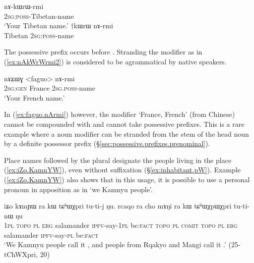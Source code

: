 \begin{exe}
 	\ex  \label{ex:nAkWrWrmi}
		\gll nɤ-kɯrɯ-rmi   \\
		\textsc{2sg}:\textsc{poss}-Tibetan-name \\
		\glt `Your Tibetan name.' 
		\ex  \label{ex:nAkWrWrmi2}
		\gll $\dagger$kɯrɯ nɤ-rmi   \\
		Tibetan \textsc{2sg}:\textsc{poss}-name \\		
\end{exe}

The possessive prefix occurs before . Stranding the modifier as in (\ref{ex:nAkWrWrmi2}) is considered to be agrammatical by native speakers.
 
\begin{exe}
	\ex  \label{ex:faguo.nArmi}
	\gll nɤʑɯɣ <faguo> nɤ-rmi   \\
	\textsc{2sg}:\textsc{gen} France \textsc{2sg}.\textsc{poss}-name \\
	\glt `Your French name.' 
\end{exe}
 
 
In (\ref{ex:faguo.nArmi}) however, the modifier  `France, French' (from Chinese) cannot be compounded with   and cannot take possessive prefixes. This is a rare example where a noun modifier can be stranded from the stem of the head noun by a definite possessor prefix (§\ref{sec:possessive.prefixes.prenominal}).

 
Place names followed by the plural  designate the people living in the place (\ref{ex:iZo.KamnYW}), even without  suffixation (§\ref{ex:inhabitant.pW}). Example (\ref{ex:iZo.KamnYW}) also shows that in this usage, it is possible to use a personal pronoun in apposition as in  `we Kamnyu people'.

\begin{exe}
\ex \label{ex:iZo.KamnYW}
 \gll iʑo kɤmɲɯ ra kɯ tɕʰɯχpri tu-ti-j ŋu. rcaqo ra cho mɤŋi ra kɯ tɕʰɯχpɯχpri tu-ti-nɯ ŋu \\
 \textsc{1pl}  \textsc{topo} \textsc{pl} \textsc{erg} salamander \textsc{ipfv}-say-\textsc{1pl} be:\textsc{fact}  \textsc{topo} \textsc{pl} \textsc{comit}  \textsc{topo} \textsc{pl} \textsc{erg}  salamander \textsc{ipfv}-say-\textsc{pl} be:\textsc{fact} \\
 \glt `We Kamnyu people call it , and people from Rqakyo and Mangi call it .' (25-tChWXpri, 20)
\end{exe}

